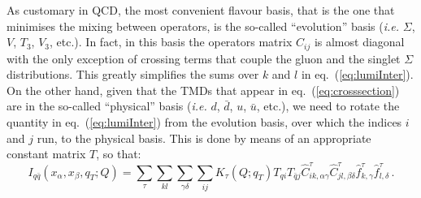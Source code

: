 \documentclass[10pt,a4paper]{article}
\begin{document}
As customary in QCD, the most convenient flavour basis, that is the
one that minimises the mixing between operators, is the so-called
``evolution'' basis (\textit{i.e.} $\Sigma$, $V$, $T_3$, $V_3$,
etc.). In fact, in this basis the operators matrix $C_{ij}$ is almost
diagonal with the only exception of crossing terms that couple the
gluon and the singlet $\Sigma$ distributions. This greatly simplifies
the sums over $k$ and $l$ in eq.~(\ref{eq:lumiInter}). On the other
hand, given that the TMDs that appear in eq.~(\ref{eq:crosssection})
are in the so-called ``physical'' basis (\textit{i.e.} $d$, $\bar{d}$,
$u$, $\bar{u}$, etc.), we need to rotate the quantity in
eq.~(\ref{eq:lumiInter}) from the evolution basis, over which the
indices $i$ and $j$ run, to the physical basis. This is done by means
of an appropriate constant matrix $T$, so that:
\begin{equation}\label{eq:lumiInterRot}
I_{q\bar{q}}(x_\alpha,x_\beta,q_T;Q)= \sum_\tau \sum_{kl} \sum_{\gamma\delta}\sum_{ij}K_\tau(Q;q_T) T_{qi}T_{\bar{q}j}\hat{C}_{ik,\alpha\gamma}^\tau
  \hat{C}_{jl,\beta\delta}^\tau \hat{f}_{k,\gamma}^\tau \hat{f}_{l,\delta}^\tau\,.
\end{equation}
\end{document}
